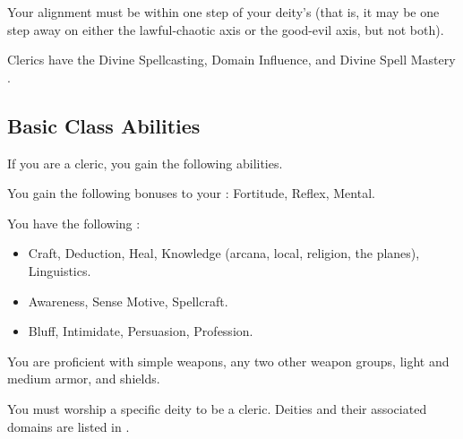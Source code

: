      Your alignment must be within one step of your deity's (that is, it may be one step away on either the lawful-chaotic axis or the good-evil axis, but not both).

     Clerics have the Divine Spellcasting, Domain Influence, and Divine Spell Mastery .

    \subsection{Basic Class Abilities}
        If you are a cleric, you gain the following abilities.

        You gain the following bonuses to your :  Fortitude,  Reflex,  Mental.

        You have the following :
        \begin{itemize}
            \item {} Craft, Deduction, Heal, Knowledge (arcana, local, religion, the planes), Linguistics.
            \item {} Awareness, Sense Motive, Spellcraft.
            \item {} Bluff, Intimidate, Persuasion, Profession.
        \end{itemize}

        You are proficient with simple weapons, any two other weapon groups, light and medium armor, and shields.

        You must worship a specific deity to be a cleric.
        Deities and their associated domains are listed in .

